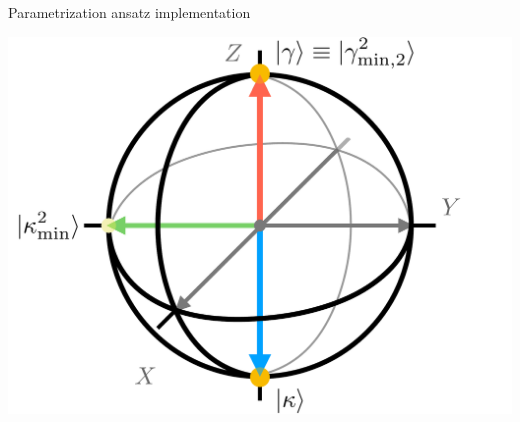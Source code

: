 \begin{frame}[allowframebreaks]{Parametrization ansatz implementation}
\begin{multicols}{2}
		\columnbreak

		\begin{center}
			\includegraphics[width=.4\paperwidth]{Figures/NJL1-model-solving/bloch-sphere}
		\end{center}

	\end{multicols}

\break


\end{frame}
